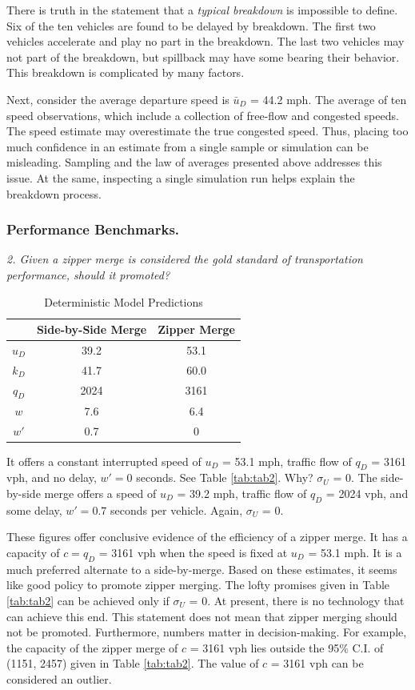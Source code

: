 \documentclass[Proceedings]{ascelike}
\begin{document}
There is truth in the statement that a \emph{typical breakdown} is impossible to define. Six of the ten vehicles are found to be delayed by breakdown. The first two vehicles  accelerate and play no part in the breakdown. The last two vehicles may not part of the breakdown, but spillback may have some bearing their behavior. This breakdown is complicated by many factors. 

Next, consider the  average departure speed is $\bar{u}_D$ = 44.2 mph. The average of ten speed observations, which include a collection of free-flow and congested speeds. The speed estimate may overestimate the true congested speed. Thus, placing too much confidence in an estimate from a single sample or simulation can be misleading.  Sampling and the law of averages  presented above addresses this issue. At the same, inspecting a single simulation run helps explain the breakdown process.

\subsubsection{Performance Benchmarks.}

\noindent \emph{2. Given a zipper merge is considered the gold standard of transportation performance, should it promoted?}


\begin{table}
\caption{Deterministic Model Predictions}
\centering
\small
\begin{tabular}{|c|c|c|}
\hline
\hline
&Side-by-Side Merge&Zipper Merge\\
\hline
 $u_D$  & 39.2 & 53.1 \\
 $k_D$  & 41.7& 60.0 \\
 $q_D$   & 2024&  3161 \\
 \hline
$w$     & 7.6 &   6.4 \\
$w'$     & 0.7 &  0  \\
 \hline
\hline
\end{tabular}
\label{tab:tab1}
\normalsize
\end{table}

It offers a constant interrupted speed of $u_D$ = 53.1 mph,  traffic flow of $q_D$ = 3161 vph, and no delay, $w' = 0$ seconds. See Table \ref{tab:tab2}. Why? $\sigma_U$ = 0. The side-by-side merge offers a speed of $u_D$ = 39.2 mph, traffic flow of  $q_D$ = 2024 vph, and some delay, $w' = 0.7$ seconds per vehicle. Again, $\sigma_U$ = 0.  

These figures offer conclusive evidence of the efficiency of a zipper merge. It has a capacity of $c = q_D$ = 3161 vph when the speed is fixed at $u_D$ = 53.1 mph. It is a much preferred alternate to a side-by-merge.  Based on these estimates, it seems like good policy to promote zipper merging.  The lofty promises given in Table \ref{tab:tab2} can be achieved only if  $\sigma_U$ = 0. At present, there is no technology that can achieve this end.    This statement does not mean that zipper merging should not be promoted. Furthermore, numbers matter in decision-making. For example, the capacity of the zipper merge  of $c$ = 3161 vph lies outside the 95$\%$ C.I. of (1151, 2457) given in Table \ref{tab:tab2}. The value of $c$ = 3161 vph can be considered an outlier.
\end{document}
